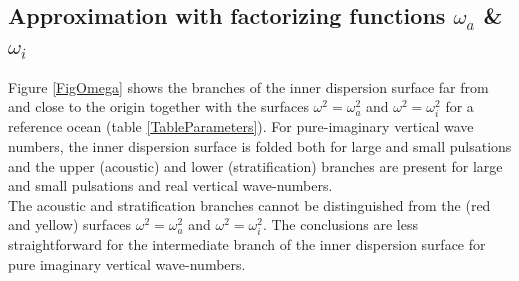 \documentclass[a4paper,11pt]{article}
\begin{document}

\subsection{Approximation with factorizing functions $\omega_a$ \& $\omega_i$}
Figure \ref{FigOmega} shows the branches of the inner dispersion surface far from and close to the origin together with the surfaces $\omega^2=\omega_a^2$ and $\omega^2=\omega_i^2$ for a reference ocean (table \ref{TableParameters}). For pure-imaginary vertical wave numbers, the inner dispersion surface is folded both for large and small pulsations and the upper (acoustic) and lower (stratification) branches are present for large and small pulsations and real vertical wave-numbers.\\
The acoustic and stratification branches cannot be distinguished from the (red and yellow) surfaces $\omega^2=\omega_a^2$ and $\omega^2=\omega_i^2$. The conclusions are less straightforward for the intermediate branch of the inner dispersion surface for pure imaginary vertical wave-numbers. 
\end{document}
